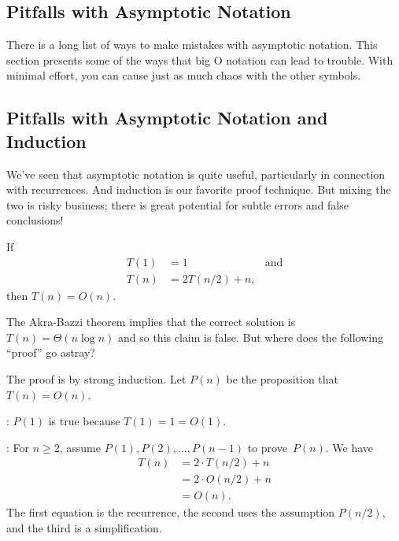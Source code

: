 \subsection{Pitfalls with Asymptotic Notation}

There is a long list of ways to make mistakes with asymptotic
notation.  This section presents some of the ways that big O notation
can lead to trouble.  With minimal effort, you can cause just
as much chaos with the other symbols.

\begin{editingnotes}
\subsection*{Pitfalls with Asymptotic Notation and Induction}

We've seen that asymptotic notation is quite useful, particularly in
connection with recurrences.  And induction is our favorite proof
technique.  But mixing the two  is risky business; there is great
potential for subtle errors and false conclusions!

\begin{falseclm*}
If
\begin{align*}
   T(1)   &= 1 & \text{and}\\
   T(n)   &= 2 T(n/2) + n,
\end{align*}
then $T(n) = O(n)$.
\end{falseclm*}

The Akra-Bazzi theorem implies that the correct solution is $T(n) =
\Theta(n \log n)$ and so this claim is false.  But where does the
following ``proof'' go astray?

\begin{bogusproof}
The proof is by strong induction.  Let $P(n)$ be the proposition that
$T(n) = O(n)$.

: $P(1)$ is true because $T(1) = 1 = O(1)$.

:
For $n \ge 2$, assume $P(1), P(2), \dots, P(n - 1)$ to
prove~$P(n)$.  We have
\begin{align*}
   T(n) &= 2 \cdot T(n/2) + n \\
        &= 2 \cdot O(n/2) + n \\
        &= O(n).
\end{align*}
The first equation is the recurrence, the second uses the assumption
$P(n/2)$, and the third is a simplification.
\end{bogusproof}


\end{editingnotes}
